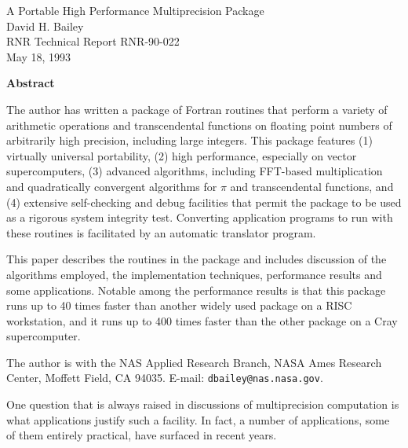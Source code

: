 \setlength{\oddsidemargin}{0cm}
\setlength{\textwidth}{16.2cm}
\setlength{\columnwidth}{16.2cm}
\setlength{\topmargin}{0cm}
\setlength{\textheight}{21.5cm}


	
\vspace*{2.7cm}
\begin{large} \begin {center}
A Portable High Performance Multiprecision Package \\
David H. Bailey \\ 
RNR Technical Report RNR-90-022 \\
May 18, 1993
\end{center} \end{large}

\vspace{3ex} \noindent
{\bf Abstract}

The author has written a package of Fortran routines that perform a
variety of arithmetic operations and transcendental functions on
floating point numbers of arbitrarily high precision, including large
integers.  This package features (1) virtually universal portability,
(2) high performance, especially on vector supercomputers, (3)
advanced algorithms, including FFT-based multiplication and
quadratically convergent algorithms for $\pi$ and transcendental
functions, and (4) extensive self-checking and debug facilities that
permit the package to be used as a rigorous system integrity test.
Converting application programs to run with these routines is
facilitated by an automatic translator program.

This paper describes the routines in the package and includes
discussion of the algorithms employed, the implementation techniques,
performance results and some applications.  Notable among the
performance results is that this package runs up to 40 times faster
than another widely used package on a RISC workstation, and it runs up
to 400 times faster than the other package on a Cray supercomputer.

\vfill{
The author is with the NAS Applied Research Branch, NASA Ames Research
Center, Moffett Field, CA 94035.  E-mail: {\tt dbailey@nas.nasa.gov}.}

\newpage
{}

One question that is always raised in discussions of multiprecision
computation is what applications justify such a facility.  In fact, a
number of applications, some of them entirely practical, have surfaced
in recent years.

